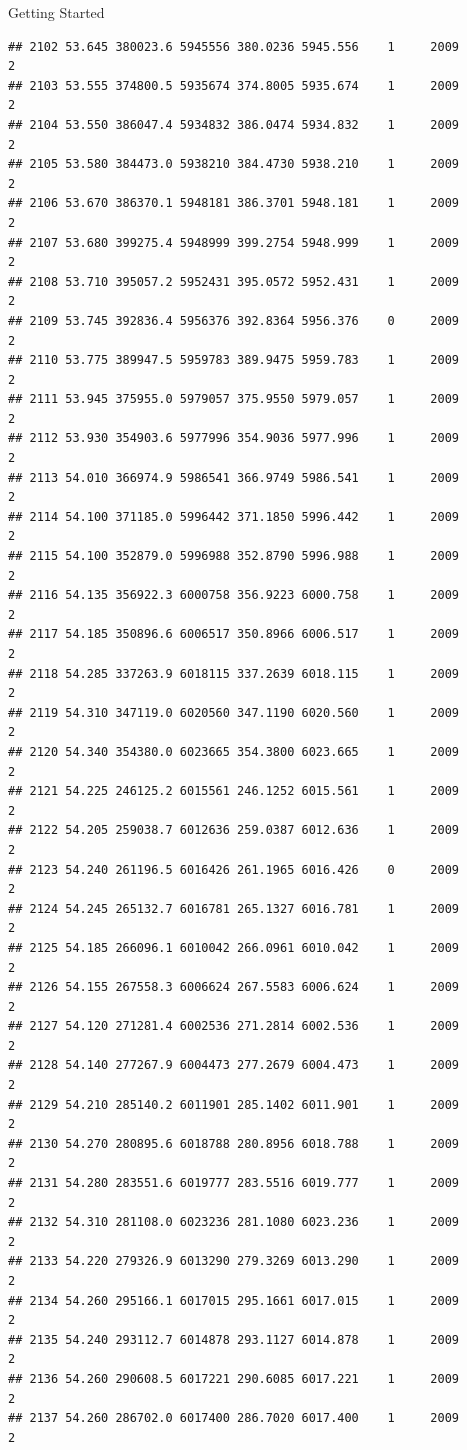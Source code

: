 \documentclass[
  ignorenonframetext,
]{beamer}
\begin{document}
\begin{frame}[fragile]{Getting Started}
\begin{verbatim}
## 2102 53.645 380023.6 5945556 380.0236 5945.556    1     2009        2
## 2103 53.555 374800.5 5935674 374.8005 5935.674    1     2009        2
## 2104 53.550 386047.4 5934832 386.0474 5934.832    1     2009        2
## 2105 53.580 384473.0 5938210 384.4730 5938.210    1     2009        2
## 2106 53.670 386370.1 5948181 386.3701 5948.181    1     2009        2
## 2107 53.680 399275.4 5948999 399.2754 5948.999    1     2009        2
## 2108 53.710 395057.2 5952431 395.0572 5952.431    1     2009        2
## 2109 53.745 392836.4 5956376 392.8364 5956.376    0     2009        2
## 2110 53.775 389947.5 5959783 389.9475 5959.783    1     2009        2
## 2111 53.945 375955.0 5979057 375.9550 5979.057    1     2009        2
## 2112 53.930 354903.6 5977996 354.9036 5977.996    1     2009        2
## 2113 54.010 366974.9 5986541 366.9749 5986.541    1     2009        2
## 2114 54.100 371185.0 5996442 371.1850 5996.442    1     2009        2
## 2115 54.100 352879.0 5996988 352.8790 5996.988    1     2009        2
## 2116 54.135 356922.3 6000758 356.9223 6000.758    1     2009        2
## 2117 54.185 350896.6 6006517 350.8966 6006.517    1     2009        2
## 2118 54.285 337263.9 6018115 337.2639 6018.115    1     2009        2
## 2119 54.310 347119.0 6020560 347.1190 6020.560    1     2009        2
## 2120 54.340 354380.0 6023665 354.3800 6023.665    1     2009        2
## 2121 54.225 246125.2 6015561 246.1252 6015.561    1     2009        2
## 2122 54.205 259038.7 6012636 259.0387 6012.636    1     2009        2
## 2123 54.240 261196.5 6016426 261.1965 6016.426    0     2009        2
## 2124 54.245 265132.7 6016781 265.1327 6016.781    1     2009        2
## 2125 54.185 266096.1 6010042 266.0961 6010.042    1     2009        2
## 2126 54.155 267558.3 6006624 267.5583 6006.624    1     2009        2
## 2127 54.120 271281.4 6002536 271.2814 6002.536    1     2009        2
## 2128 54.140 277267.9 6004473 277.2679 6004.473    1     2009        2
## 2129 54.210 285140.2 6011901 285.1402 6011.901    1     2009        2
## 2130 54.270 280895.6 6018788 280.8956 6018.788    1     2009        2
## 2131 54.280 283551.6 6019777 283.5516 6019.777    1     2009        2
## 2132 54.310 281108.0 6023236 281.1080 6023.236    1     2009        2
## 2133 54.220 279326.9 6013290 279.3269 6013.290    1     2009        2
## 2134 54.260 295166.1 6017015 295.1661 6017.015    1     2009        2
## 2135 54.240 293112.7 6014878 293.1127 6014.878    1     2009        2
## 2136 54.260 290608.5 6017221 290.6085 6017.221    1     2009        2
## 2137 54.260 286702.0 6017400 286.7020 6017.400    1     2009        2

\end{verbatim}
\end{frame}
\end{document}
